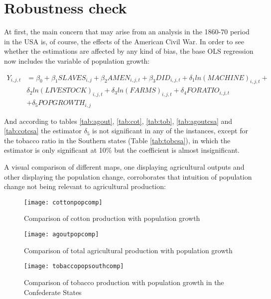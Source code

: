\documentclass[12pt]{report}
\begin{document}
\section{Robustness check}\label{sec:Robustness check}
At first, the main concern that may arise from an analysis in the 1860-70 period in the USA is, of course, the effects of the American Civil War. In order to see whether the estimations are affected by any kind of bias, the base OLS regression now includes the variable of population growth:

\begin{equation}\begin{split}
Y_{i,j,t} &=\beta_{0}+\beta_{1}SLAVES_{i,j}+\beta_{2}AMEN_{i,j,t}+\beta_{3}DID_{i,j,t}+\delta_{1}ln(MACHINE)_{i,j,t}+
\\
&\delta_{2}ln(LIVESTOCK)_{i,j,t}+\delta_{3}ln(FARMS)_{i,j,t}+\delta_{4}FORATIO_{i,j,t}
\\
&+\delta_{5}POPGROWTH_{i,j}
\end{split}
\end{equation}

And according to tables \ref{tab:agout}, \ref{tab:cot}, \ref{tab:tob}, \ref{tab:agoutcsa} and \ref{tab:cotcsa} the estimator $\delta_{5}$ is not significant in any of the instances, except for the tobacco ratio in the Southern states (Table \ref{tab:tobcsa}), in which the estimator is only significant at 10\% but the coefficient is almost insignificant.

A visual comparison of different maps, one displaying agricultural outputs and other displaying the population change, corroborates that intuition of population change not being relevant to agricultural production:


\begin{figure}[h!]
\centering
\texttt{[image: cottonpopcomp]} \caption{Comparison of cotton production with population growth} \label{fig:cottonpopcomp}
\end{figure}

\begin{figure}[h!]
\centering
\texttt{[image: agoutpopcomp]} \caption{Comparison of total agricultural production with population growth} \label{fig:agoutpopcomp}
\end{figure}

\begin{figure}[h!]
\centering
\texttt{[image: tobaccopopsouthcomp]} \caption{Comparison of tobacco production with population growth in the Confederate States} \label{fig:tobaccopopsouthcomp}
\end{figure}
\end{document}
